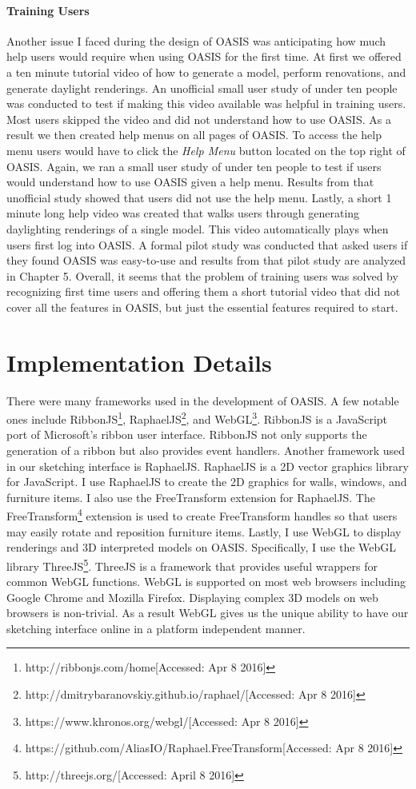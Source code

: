 \paragraph{Training Users}
Another issue I faced during the design of OASIS was anticipating how much help users would require when using OASIS for the first time. At first we offered a ten minute tutorial video of how to generate a model, perform renovations, and generate daylight renderings. An unofficial small user study of under ten people was conducted to test if making this video available was helpful in training users. Most users skipped the video and did not understand how to use OASIS. As a result we then created help menus on all pages of OASIS. To access the help menu users would have to click the \textit{Help Menu} button located on the top right of OASIS. Again, we ran a small user study of under ten people to test if users would understand how to use OASIS given a help menu.
Results from that unofficial study showed that users did not use the help menu.
Lastly, a short 1 minute long help video was created that walks users through generating daylighting renderings of a single model. This video automatically plays when users first log into OASIS.
A formal pilot study was conducted that asked users if they found OASIS was easy-to-use and results from that pilot study are analyzed in Chapter 5. Overall, it seems that the problem of training users was solved by recognizing first time users and offering them a short tutorial video that did not cover all the features in OASIS, but just the essential features required to start.

\section{Implementation Details}
There were many frameworks used in the development of OASIS.
A few notable ones include RibbonJS\footnote{http://ribbonjs.com/home[Accessed: Apr 8 2016]}, RaphaelJS\footnote{http://dmitrybaranovskiy.github.io/raphael/[Accessed: Apr 8 2016]}, and WebGL\footnote{https://www.khronos.org/webgl/[Accessed: Apr 8 2016]}.
RibbonJS is a JavaScript port of Microsoft's ribbon user interface.
RibbonJS not only supports the generation of a ribbon but also provides event handlers.
Another framework used in our sketching interface is RaphaelJS.
RaphaelJS is a 2D vector graphics library for JavaScript. 
I use RaphaelJS to create the 2D graphics for walls, windows, and furniture items.
I also use the FreeTransform extension for RaphaelJS. 
The FreeTransform\footnote{https://github.com/AliasIO/Raphael.FreeTransform[Accessed: Apr 8 2016]} extension is used to create FreeTransform handles so that users may easily rotate and reposition furniture items.
Lastly, I use WebGL to display renderings and 3D interpreted models on OASIS. 
Specifically, I use the WebGL library ThreeJS\footnote{http://threejs.org/[Accessed: April 8 2016]}.
ThreeJS is a framework that provides useful wrappers for common WebGL functions.
WebGL is supported on most web browsers including Google Chrome and Mozilla Firefox.
Displaying complex 3D models on web browsers is non-trivial.
As a result WebGL gives us the unique ability to have our sketching interface online in a platform independent manner.


